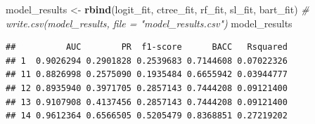 \documentclass[]{article}
\newenvironment{Shaded}{\begin{snugshade}}{\end{snugshade}}
\newcommand{\CommentTok}[1]{\textcolor[rgb]{0.56,0.35,0.01}{\textit{#1}}}
\newcommand{\KeywordTok}[1]{\textcolor[rgb]{0.13,0.29,0.53}{\textbf{#1}}}
\newcommand{\NormalTok}[1]{#1}
\newcommand{\StringTok}[1]{\textcolor[rgb]{0.31,0.60,0.02}{#1}}
\begin{document}
\begin{Shaded}
\begin{Highlighting}[]
\NormalTok{model_results <-}\StringTok{ }\KeywordTok{rbind}\NormalTok{(logit_fit, ctree_fit, rf_fit, sl_fit, bart_fit)}
\CommentTok{# write.csv(model_results, file = "model_results.csv")}
\NormalTok{model_results}
\end{Highlighting}
\end{Shaded}

\begin{verbatim}
##          AUC        PR  f1-score      BACC   Rsquared
## 1  0.9026294 0.2901828 0.2539683 0.7144608 0.07022326
## 11 0.8826998 0.2575090 0.1935484 0.6655942 0.03944777
## 12 0.8935940 0.3971705 0.2857143 0.7444208 0.09121400
## 13 0.9107908 0.4137456 0.2857143 0.7444208 0.09121400
## 14 0.9612364 0.6566505 0.5205479 0.8368851 0.27219202
\end{verbatim}
\end{document}
